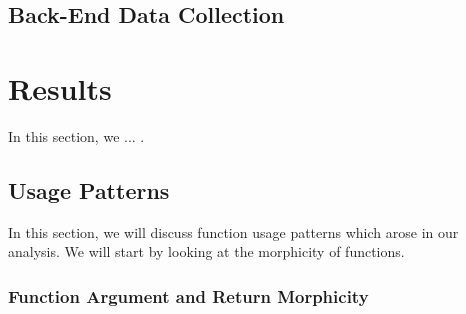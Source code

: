 \documentclass[acmsmall,10pt,review,anonymous]{acmart}\settopmatter{printfolios=true,printccs=false,printacmref=false}
\begin{document}




%
%
%
%
\subsection{Back-End Data Collection}


%
%
%
%
%
%
\section{Results}

In this section, we ... .

%
%
%
%
\subsection{Usage Patterns}

In this section, we will discuss function usage patterns which arose in our analysis.
We will start by looking at the morphicity of functions.

\subsubsection{Function Argument and Return Morphicity}
\end{document}
